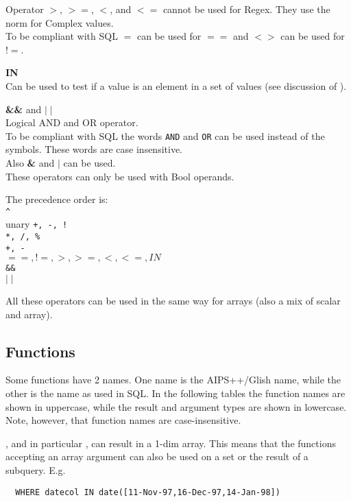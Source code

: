 \begin{description}
       Operator $>$, $>=$, $<$, and $<=$ cannot be used for Regex.
       They use the norm for Complex values.
       \\To be compliant with SQL $=$ can be used for
       $==$ and $<>$ can be used for $!=$.
  \item[] \textbf{IN}
       \\Can be used to test if a value is an element in a set of
       values (see discussion of ).
  \item[] \textbf{\&\&} and \textbf{$\mid\mid$}
       \\Logical AND and OR operator. 
       \\To be compliant with SQL the
       words \texttt{AND} and \texttt{OR} can be used instead of the
       symbols. These words are case insensitive.
       \\Also \textbf{\&} and \textbf{$\mid$} can be used.
       \\These operators can only be used with Bool operands.
\end{description}
\begin{description}
  \item The precedence order is:
       \\\verb+^+
       \\unary \texttt{+, -, !}
       \\\texttt{*, /, \%}
       \\\texttt{+, -}
       \\\texttt{$==, !=, >, >=, <, <=, IN$}
       \\\texttt{\&\&}
       \\\texttt{$\mid\mid$}
\end{description}
All these operators can be used in the same way for arrays
(also a mix of scalar and array).

\subsection{\label{TAQL:FUNCTIONS}Functions}
Some functions have 2 names. One name is the AIPS++/Glish name, while the
other is the name as used in SQL.
In the following tables the function names are shown in uppercase,
while the result and argument types are shown in lowercase.
Note, however, that function names are case-insensitive.

, and in particular
, can result in a 1-dim array.
This means that the functions accepting an array argument can also
be used on a set or the result of a subquery. E.g.
\begin{verbatim}
  WHERE datecol IN date([11-Nov-97,16-Dec-97,14-Jan-98])
\end{verbatim}
